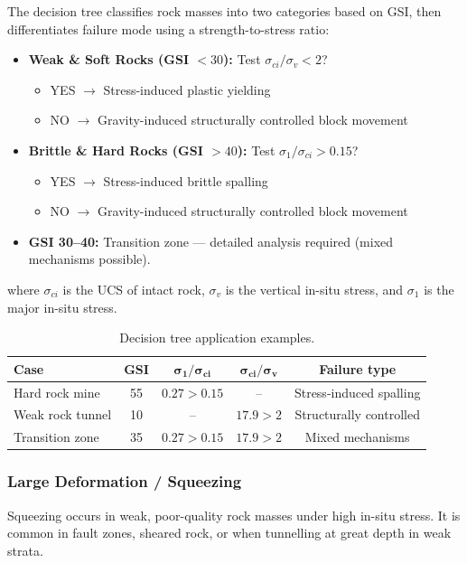 \documentclass[a4paper,12pt]{article}
\begin{document}
The decision tree classifies rock masses into two categories based on GSI, then differentiates failure mode using a strength-to-stress ratio:
\begin{itemize}
    \item \textbf{Weak \& Soft Rocks (GSI $< 30$):} Test $\sigma_{ci}/\sigma_v < 2$?
    \begin{itemize}
        \item YES $\rightarrow$ Stress-induced plastic yielding
        \item NO $\rightarrow$ Gravity-induced structurally controlled block movement
    \end{itemize}
    \item \textbf{Brittle \& Hard Rocks (GSI $> 40$):} Test $\sigma_1/\sigma_{ci} > 0.15$?
    \begin{itemize}
        \item YES $\rightarrow$ Stress-induced brittle spalling
        \item NO $\rightarrow$ Gravity-induced structurally controlled block movement
    \end{itemize}
    \item \textbf{GSI 30--40:} Transition zone --- detailed analysis required (mixed mechanisms possible).
\end{itemize}

where $\sigma_{ci}$ is the UCS of intact rock, $\sigma_v$ is the vertical in-situ stress, and $\sigma_1$ is the major in-situ stress.

\begin{table}[ht]
\centering
\begin{tabular}{lcccc}
\toprule
\textbf{Case} & \textbf{GSI} & $\boldsymbol{\sigma_1/\sigma_{ci}}$ & $\boldsymbol{\sigma_{ci}/\sigma_v}$ & \textbf{Failure type} \\
\midrule
Hard rock mine & 55 & $0.27 > 0.15$ & -- & Stress-induced spalling \\
Weak rock tunnel & 10 & -- & $17.9 > 2$ & Structurally controlled \\
Transition zone & 35 & $0.27 > 0.15$ & $17.9 > 2$ & Mixed mechanisms \\
\bottomrule
\end{tabular}
\caption{Decision tree application examples.}
\end{table}

\subsubsection{Large Deformation / Squeezing}
Squeezing occurs in weak, poor-quality rock masses under high in-situ stress. It is common in fault zones, sheared rock, or when tunnelling at great depth in weak strata.
\end{document}
